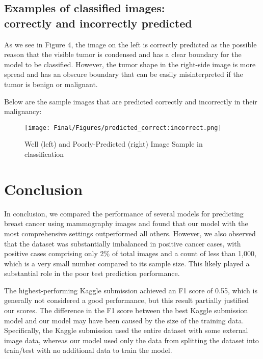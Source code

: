 \documentclass[11pt,letterpaper, twocolumn]{article}
\begin{document}
\subsection{Examples of classified images: \\ correctly and incorrectly predicted}
As we see in Figure 4, the image on the left is correctly predicted as the possible reason that the visible tumor is condensed and has a clear boundary for the model to be classified. However, the tumor shape in the right-side image is more spread and has an obscure boundary that can be easily misinterpreted if the tumor is benign or malignant.

Below are the sample images that are predicted correctly and incorrectly in their malignancy: 
\begin{figure}[H]
    \centering
    \texttt{[image: Final/Figures/predicted\_correct:incorrect.png]}
    \caption{Well (left) and Poorly-Predicted (right) Image Sample in classification}
    \label{fig: classified_correct+incorrect}    
\end{figure}
\section{Conclusion}
In conclusion, we compared the performance of several models for predicting breast cancer using mammography images and found that our model with the most comprehensive settings outperformed all others. However, we also observed that the dataset was substantially imbalanced in positive cancer cases, with positive cases comprising only 2\% of total images and a count of less than 1,000, which is a very small number compared to its sample size. This likely played a substantial role in the poor test prediction performance. 

The highest-performing Kaggle submission achieved an F1 score of 0.55, which is generally not considered a good performance, but this result partially justified our scores. The difference in the F1 score between the best Kaggle submission model and our model may have been caused by the size of the training data. Specifically, the Kaggle submission used the entire dataset with some external image data, whereas our model used only the data from splitting the dataset into train/test with no additional data to train the model. 
\end{document}

